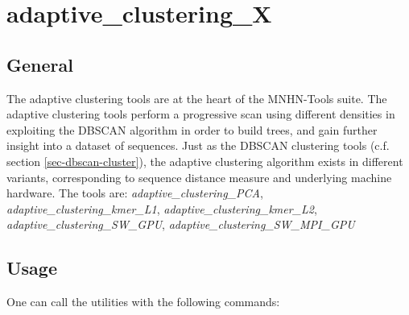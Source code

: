 \section{adaptive\_clustering\_X} \label{sec-adaptive-clust}

\subsection{General}
The adaptive clustering tools are at the heart of the MNHN-Tools suite.
The adaptive clustering tools perform a progressive scan using
different densities in exploiting the DBSCAN \cite{dbscan} algorithm in order to
build trees, and gain further insight into a dataset of
sequences. Just as the DBSCAN clustering tools (c.f. section
\ref{sec-dbscan-cluster}), the adaptive
clustering algorithm exists in different variants, corresponding to
sequence distance measure and underlying machine hardware. The tools
are: \emph{adaptive\_clustering\_PCA}, \emph{adaptive\_clustering\_kmer\_L1},
\emph{adaptive\_clustering\_kmer\_L2}, \emph{adaptive\_clustering\_SW\_GPU},
\emph{adaptive\_clustering\_SW\_MPI\_GPU} 

\subsection{Usage}

One can call the utilities with the following commands: 

